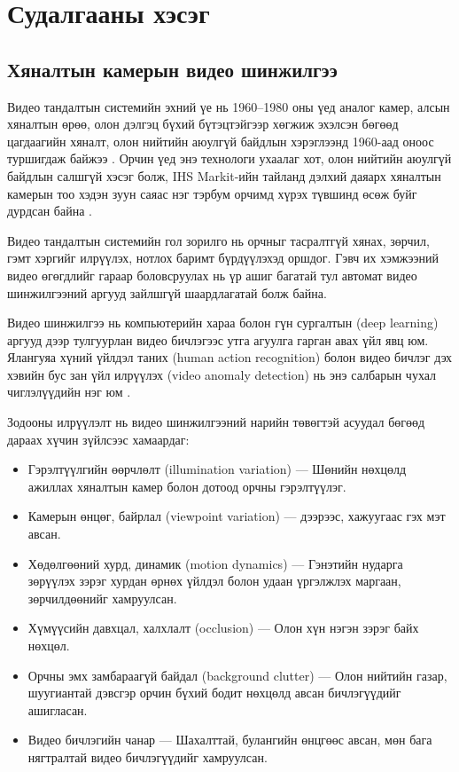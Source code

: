 
\chapter{Судалгааны хэсэг}

\section{Хяналтын камерын видео шинжилгээ}

Видео тандалтын системийн эхний үе нь 1960--1980 оны үед аналог камер, алсын хяналтын өрөө, олон дэлгэц бүхий бүтэцтэйгээр хөгжиж эхэлсэн бөгөөд цагдаагийн хяналт, олон нийтийн аюулгүй байдлын хэрэглээнд 1960-аад оноос туршигдаж байжээ \cite{Snidaro2009, Williams2003}. Орчин үед энэ технологи ухаалаг хот, олон нийтийн аюулгүй байдлын салшгүй хэсэг болж, IHS Markit-ийн тайланд дэлхий даяарх хяналтын камерын тоо хэдэн зуун саяас нэг тэрбум орчимд хүрэх түвшинд өсөж буйг дурдсан байна \cite{IHSMarkit2019}.

Видео тандалтын системийн гол зорилго нь орчныг тасралтгүй хянах, зөрчил, гэмт хэргийг илрүүлэх, нотлох баримт бүрдүүлэхэд оршдог. Гэвч их хэмжээний видео өгөгдлийг гараар боловсруулах нь үр ашиг багатай тул автомат видео шинжилгээний аргууд зайлшгүй шаардлагатай болж байна.

Видео шинжилгээ нь компьютерийн хараа болон гүн сургалтын (deep learning) аргууд дээр тулгуурлан видео бичлэгээс утга агуулга гарган авах үйл явц юм. Ялангуяа хүний үйлдэл таних (human action recognition) болон видео бичлэг дэх хэвийн бус зан үйл илрүүлэх (video anomaly detection) нь энэ салбарын чухал чиглэлүүдийн нэг юм \cite{Poppe2010, Ramachandra2022}.

Зодооны илрүүлэлт нь видео шинжилгээний нарийн төвөгтэй асуудал бөгөөд дараах хүчин зүйлсээс хамаардаг:

\begin{itemize}
    \item Гэрэлтүүлгийн өөрчлөлт (illumination variation) — Шөнийн нөхцөлд ажиллах хяналтын камер болон дотоод орчны гэрэлтүүлэг.
    \item Камерын өнцөг, байрлал (viewpoint variation) — дээрээс, хажуугаас гэх мэт авсан.
    \item Хөдөлгөөний хурд, динамик (motion dynamics) — Гэнэтийн нударга зөрүүлэх зэрэг хурдан өрнөх үйлдэл болон удаан үргэлжлэх маргаан, зөрчилдөөнийг хамруулсан.
    \item Хүмүүсийн давхцал, халхлалт (occlusion) — Олон хүн нэгэн зэрэг байх нөхцөл.
    \item Орчны эмх замбараагүй байдал (background clutter) — Олон нийтийн газар, шуугиантай дэвсгэр орчин бүхий бодит нөхцөлд авсан бичлэгүүдийг ашигласан.
    \item Видео бичлэгийн чанар — Шахалттай, булангийн өнцгөөс авсан, мөн бага нягтралтай видео бичлэгүүдийг хамруулсан.
\end{itemize}

